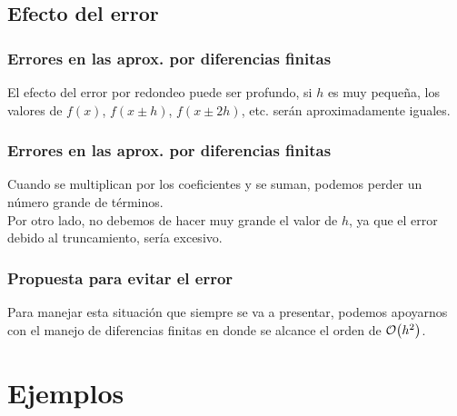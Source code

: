 \subsection{Efecto del error}
\begin{frame}
\frametitle{Errores en las aprox. por diferencias finitas}
El efecto del error por redondeo puede ser profundo, si $h$ es muy pequeña, los valores de $f(x)$, $f(x \pm h)$, $f(x \pm 2h)$, etc. serán aproximadamente iguales.
\end{frame}
\begin{frame}
\frametitle{Errores en las aprox. por diferencias finitas}
Cuando se multiplican por los coeficientes y se suman, podemos perder un número grande de términos.
\\
\bigskip
Por otro lado, no debemos de hacer muy grande el valor de $h$, ya que el error debido al truncamiento, sería excesivo.
\end{frame}
\begin{frame}
\frametitle{Propuesta para evitar el error}
Para manejar esta situación que siempre se va a presentar, podemos apoyarnos con el manejo de diferencias finitas en donde se alcance el orden de $\order{h^{2}}$.
\end{frame}
\section{Ejemplos}
